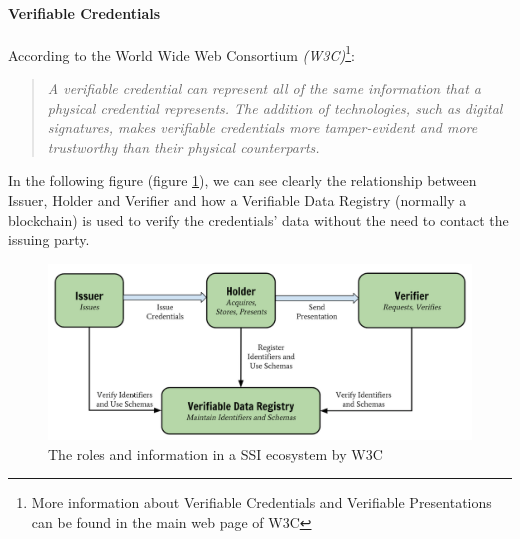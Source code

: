 \documentclass[a4paper, 12pt]{article} %
\begin{document}
                \paragraph{Verifiable Credentials}
                    According to the World Wide Web Consortium \textit{(W3C)}\cite{w3c-vc}\footnote{\label{footnote-w3c}More information about Verifiable Credentials and Verifiable Presentations can be found in the main web page of W3C\cite{w3c-vc}}:
                    \begin{quote}
                        \textit{A verifiable credential can represent all of the same information that a physical credential represents. The addition of technologies, such as digital signatures, makes verifiable credentials more tamper-evident and more trustworthy than their physical counterparts.}
                    \end{quote}
                    In the following figure (figure \ref{fig:ssi-vc}), we can see clearly the relationship between Issuer, Holder and Verifier and how a Verifiable Data Registry (normally a blockchain) is used to verify the credentials’ data without the need to contact the issuing party.
                    \begin{figure}[h]
                        \centering
                        \includegraphics[width=1.0\textwidth]{ssi-vc.png}
                        \caption{The roles and information in a SSI ecosystem by W3C}
                        \label{fig:ssi-vc}
                    \end{figure}
                
\end{document}
